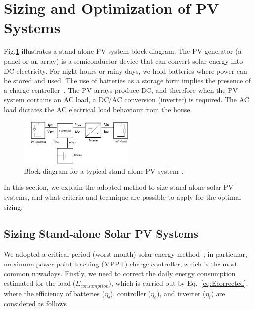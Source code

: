 \documentclass[journal]{IEEEtran}
\begin{document}
\section{Sizing and Optimization of PV Systems}
\label{sec:Background}

Fig.\ref{fig:blockdiagram} illustrates a stand-alone PV system block diagram. The PV generator (a panel or an array) is a semiconductor device that can convert solar energy into DC electricity. For night hours or rainy days, we hold batteries where power can be stored and used. The use of batteries as a storage form implies the presence of a charge controller~\cite{Hansen}. The PV arrays produce DC, and therefore when the PV system contains an AC load, a DC/AC conversion (inverter) is required. The AC load dictates the AC electrical load behaviour from the house.
%
\begin{figure}[h]
\hspace*{-1cm}\includegraphics[width=0.5\textwidth]{blockdiagramPVS2_rev}
\centering
\caption{Block diagram for a typical stand-alone PV system~\cite{Hansen}.}
\label{fig:blockdiagram} 
\end{figure}

In this section, we explain the adopted method to size stand-alone solar PV systems, and what criteria and technique are possible to apply for the optimal sizing. 

\subsection{Sizing Stand-alone Solar PV Systems}
\label{sec:sizing}

We adopted a critical period (worst month) solar energy method~\cite{Pinho}; in particular, maximum power point tracking (MPPT) charge controller, which is the most common nowadays. Firstly, we need to correct the daily energy consumption estimated for the load ($E_{consumption}$), which is carried out by Eq.~\eqref{eq:Ecorrected}, where the efficiency of batteries ($\eta_{b}$), controller ($\eta_{c}$), and inverter ($\eta_{i}$) are considered as follows
\end{document}
